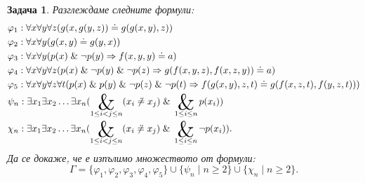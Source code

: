 \documentclass[12pt]{article}
\DeclareMathOperator*{\bigand}{\scalerel*{\&}{\sum}}
\newtheorem{problem}{Задача}[section]
\theoremstyle{definition}
\begin{document}
\begin{problem}
Разглеждаме следните формули:
\begin{align*}
     & \varphi_1 : \forall x \forall y \forall z (g(x, g(y, z)) \doteq g(g(x, y), z))                                                                                                \\
     & \varphi_2 : \forall x \forall y (g(x, y) \doteq g(y, x))                                                                                                                      \\
     & \varphi_3 : \forall x \forall y (p(x) \; \& \; \neg p(y) \Rightarrow f(x, y, y) \doteq a)                                                                                     \\
     & \varphi_4 : \forall x \forall y \forall z (p(x) \; \& \; \neg p(y) \; \& \; \neg p(z) \Rightarrow g(f(x, y, z), f(x, z, y)) \doteq a)                                         \\
     & \varphi_5 : \forall x \forall y \forall z \forall t (p(x) \; \& \; p(y) \; \& \; \neg p(z) \; \& \; \neg p(t)  \Rightarrow f(g(x, y), z, t) \doteq g(f(x, z, t), f(y, z, t))) \\
     & \psi_n : \exists x_1 \exists x_2 \dots \exists x_n (\bigand_{1 \leq i < j \leq n} (x_i \not \doteq x_j) \; \& \; \bigand_{1 \leq i \leq n} p(x_i))                            \\
     & \chi_n : \exists x_1 \exists x_2 \dots \exists x_n (\bigand_{1 \leq i < j \leq n} (x_i \not \doteq x_j) \; \& \; \bigand_{1 \leq i \leq n} \neg p(x_i)).
\end{align*}
Да се докаже, че е изпълимо множеството от формули:
\[
    \Gamma = \{ \varphi_1, \varphi_2, \varphi_3, \varphi_4, \varphi_5 \} \cup \{ \psi_n \mid n \geq 2 \} \cup \{ \chi_n \mid n \geq 2 \}.
\]
\end{problem}
\end{document}

